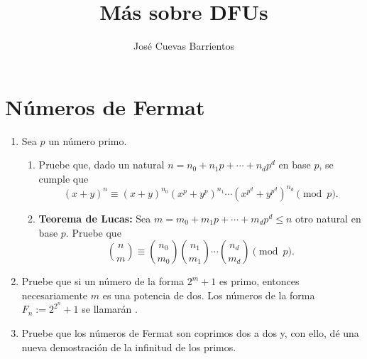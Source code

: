 \documentclass[11pt, reqno]{amsart}
\title{Más sobre DFUs}
\date{\DTMdate{2025-08-22}}
\author[José Cuevas]{José Cuevas Barrientos}
\begin{document}
\maketitle

\section{Números de Fermat}
\begin{enumerate}
	\item Sea $p$ un número primo.
		\begin{enumerate}
			\item Pruebe que, dado un natural $n = n_0 + n_1p + \cdots + n_dp^d$ en base $p$, se cumple que
				\[
					(x + y)^n \equiv (x + y)^{n_0}(x^p + y^p)^{n_1} \cdots \left( x^{p^d} + y^{p^d} \right)^{n_d} \pmod p.
				\]

			\item \textbf{Teorema de Lucas:}
				Sea $m = m_0 + m_1p + \cdots + m_dp^d \le n$ otro natural en base $p$.
				Pruebe que
				\[
					\binom{n}{m} \equiv \binom{n_0}{m_0} \binom{n_1}{m_1} \cdots \binom{n_d}{m_d} \pmod p.
				\]
		\end{enumerate}

	\item Pruebe que si un número de la forma $2^m + 1$ es primo, entonces necesariamente $m$ es una potencia de dos.
		Los números de la forma $F_n := 2^{2^n} + 1$ se llamarán .

	\item\lookright
		Pruebe que los números de Fermat son coprimos dos a dos y, con ello, dé una nueva demostración de la infinitud de los primos.
\end{enumerate}
\end{document}
